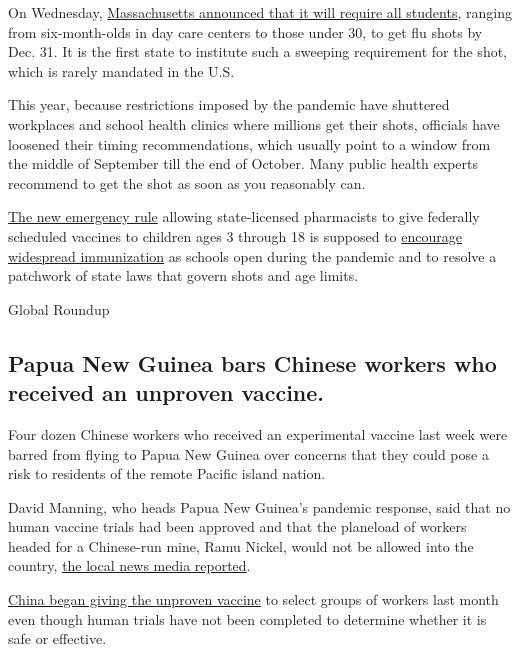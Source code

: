 On Wednesday,
\href{https://www.mass.gov/news/flu-vaccine-now-required-for-all-massachusetts-school-students-enrolled-in-child-care-pre}{Massachusetts
announced that it will require all students}, ranging from
six-month-olds in day care centers to those under 30, to get flu shots
by Dec. 31. It is the first state to institute such a sweeping
requirement for the shot, which is rarely mandated in the U.S.

This year, because restrictions imposed by the pandemic have shuttered
workplaces and school health clinics where millions get their shots,
officials have loosened their timing recommendations, which usually
point to a window from the middle of September till the end of October.
Many public health experts recommend to get the shot as soon as you
reasonably can.

\href{https://www.phe.gov/Preparedness/legal/prepact/Pages/default.aspx}{The
new emergency rule} allowing state-licensed pharmacists to give
federally scheduled vaccines to children ages 3 through 18 is supposed
to
\href{https://www.phe.gov/Preparedness/legal/prepact/Pages/default.aspx}{encourage
widespread immunization} as schools open during the pandemic and to
resolve a patchwork of state laws that govern shots and age limits.

Global Roundup

\hypertarget{papua-new-guinea-bars-chinese-workers-who-received-an-unproven-vaccine}{%
\subsection{Papua New Guinea bars Chinese workers who received an
unproven
vaccine.}\label{papua-new-guinea-bars-chinese-workers-who-received-an-unproven-vaccine}}

Four dozen Chinese workers who received an experimental vaccine last
week were barred from flying to Papua New Guinea over concerns that they
could pose a risk to residents of the remote Pacific island nation.

David Manning, who heads Papua New Guinea's pandemic response, said that
no human vaccine trials had been approved and that the planeload of
workers headed for a Chinese-run mine, Ramu Nickel, would not be allowed
into the country,
\href{https://www.facebookcorewwwi.onion/NBCNewsPNG/}{the local news
media reported}.

\href{https://www.nytimes3xbfgragh.onion/2020/07/16/business/china-vaccine-coronavirus.html}{China
began giving the unproven vaccine} to select groups of workers last
month even though human trials have not been completed to determine
whether it is safe or effective.

